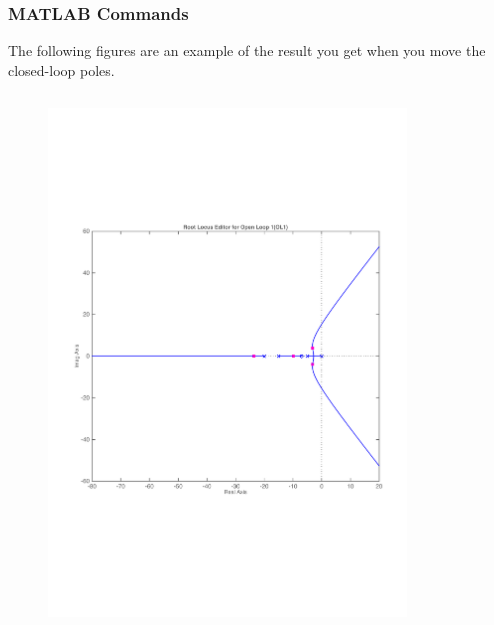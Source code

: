 \begin{frame}
\frametitle{MATLAB Commands}
	\begin{exampleblock}{}
		The following figures are an example of the result you get when you move the closed-loop poles.
	\begin{columns}
		\begin{column}{0.5\textwidth}
			\begin{figure}
				\centering
				\includegraphics[width=0.9\linewidth]{matlab_ex4}
			\end{figure}
		\end{column}
		\begin{column}{0.5\textwidth}
			\begin{figure}
				\centering

\end{figure}
\end{column}
\end{columns}
\end{exampleblock}
\end{frame}
